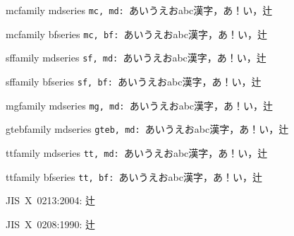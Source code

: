\documentclass{ltjsarticle}
\begin{document}
\def\r#1#2{ \csname #1family \endcsname \csname #2series \endcsname
  {\tt #1, #2: }あいうえおabc漢字，あ！い，辻
}

\r{mc}{md}

\r{mc}{bf}



\r{sf}{md}

\r{sf}{bf}

\ifdefined\mgfamily
\r{mg}{md}
\fi

\ifdefined\gtebfamily
\r{gteb}{md}
\fi

\r{tt}{md}

\r{tt}{bf}

JIS~X~0213:2004: {\LARGE 辻}

JIS~X~0208:1990: {\LARGE 辻}
\end{document}
